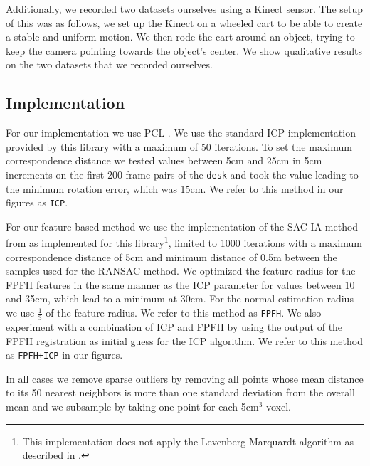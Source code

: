 \documentclass[a4paper]{article}
\begin{document}
Additionally, we recorded two datasets ourselves using a Kinect sensor. The setup of this was as follows, we set up the Kinect on a wheeled cart to be able to create a stable and uniform motion. We then rode the cart around an object, trying to keep the camera pointing towards the object's center. We show qualitative results on the two datasets that we recorded ourselves.

\subsection{Implementation}

For our implementation we use \ac{PCL} \cite{Rusu_ICRA2011_PCL}. We use the standard \ac{ICP} implementation provided by this library with a maximum of 50 iterations. To set the maximum correspondence distance we tested values between 5cm and 25cm in 5cm increments on the first 200 frame pairs of the \texttt{desk} and took the value leading to the minimum rotation error, which was 15cm. We refer to this method in our figures as \texttt{ICP}.

 For our feature based method we use the implementation of the \ac{SAC-IA} method from \cite{rusu2009fast} as implemented for this library\footnote{This implementation does not apply the Levenberg-Marquardt algorithm as described in \cite{rusu2009fast}.}, limited to 1000 iterations with a maximum correspondence distance of 5cm and minimum distance of 0.5m between the samples used for the \ac{RANSAC} method. We optimized the feature radius  for the \ac{FPFH} features in the same manner as the \ac{ICP} parameter for values between 10 and 35cm, which lead to a minimum at 30cm. For the normal estimation radius we use $\frac{1}{3}$ of the feature radius. We refer to this method as \texttt{FPFH}. We also experiment with a combination of \ac{ICP} and \ac{FPFH} by using the output of the \ac{FPFH} registration as initial guess for the \ac{ICP} algorithm. We refer to this method as \texttt{FPFH+ICP} in our figures.
 
In all cases we remove sparse outliers by removing all points whose mean distance to its 50 nearest neighbors is more than one standard deviation from the overall mean and we subsample by taking one point for each 5cm$^3$ voxel.

\end{document}
